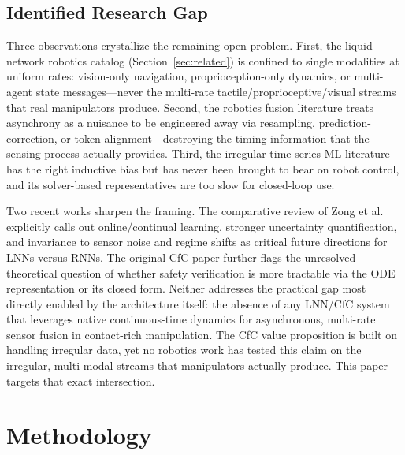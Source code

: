 \documentclass[conference]{IEEEtran}
\begin{document}
\subsection{Identified Research Gap}
Three observations crystallize the remaining open problem. First, the liquid-network robotics catalog (Section~\ref{sec:related}) is confined to single modalities at uniform rates: vision-only navigation, proprioception-only dynamics, or multi-agent state messages---never the multi-rate tactile/proprioceptive/visual streams that real manipulators produce. Second, the robotics fusion literature treats asynchrony as a nuisance to be engineered away via resampling, prediction-correction, or token alignment---destroying the timing information that the sensing process actually provides. Third, the irregular-time-series ML literature has the right inductive bias but has never been brought to bear on robot control, and its solver-based representatives are too slow for closed-loop use.

Two recent works sharpen the framing. The comparative review of Zong et al. \cite{zong2025comparative} explicitly calls out online/continual learning, stronger uncertainty quantification, and invariance to sensor noise and regime shifts as critical future directions for LNNs versus RNNs. The original CfC paper \cite{hasani2022cfc} further flags the unresolved theoretical question of whether safety verification is more tractable via the ODE representation or its closed form. Neither addresses the practical gap most directly enabled by the architecture itself: the absence of any LNN/CfC system that leverages native continuous-time dynamics for asynchronous, multi-rate sensor fusion in contact-rich manipulation. The CfC value proposition is built on handling irregular data, yet no robotics work has tested this claim on the irregular, multi-modal streams that manipulators actually produce. This paper targets that exact intersection.

\section{Methodology}
\label{sec:method}
\end{document}
